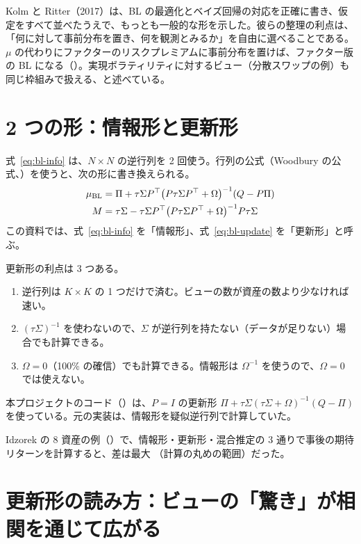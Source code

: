 Kolm と Ritter（2017）は、BL の最適化とベイズ回帰の対応を正確に書き、仮定をすべて並べたうえで、もっとも一般的な形を示した。彼らの整理の利点は、「何に対して事前分布を置き、何を観測とみるか」を自由に選べることである。$\mu$ の代わりにファクターのリスクプレミアムに事前分布を置けば、ファクター版の BL になる（）。実現ボラティリティに対するビュー（分散スワップの例）も同じ枠組みで扱える、と述べている。

\section{2 つの形：情報形と更新形}\label{sec:forms}

式~\eqref{eq:bl-info} は、$N\times N$ の逆行列を 2 回使う。行列の公式（Woodbury の公式、）を使うと、次の形に書き換えられる。
\begin{align}
\mu_{\mathrm{BL}}&=\Pi+\tau\Sigma P^{\top}\bigl(P\tau\Sigma P^{\top}+\Omega\bigr)^{-1}(Q-P\Pi)\label{eq:bl-update}\\
M&=\tau\Sigma-\tau\Sigma P^{\top}\bigl(P\tau\Sigma P^{\top}+\Omega\bigr)^{-1}P\tau\Sigma\label{eq:M-update}
\end{align}
この資料では、式~\eqref{eq:bl-info} を「情報形」、式~\eqref{eq:bl-update} を「更新形」と呼ぶ。

更新形の利点は 3 つある。

\begin{enumerate}
\item 逆行列は $K\times K$ の 1 つだけで済む。ビューの数が資産の数より少なければ速い。
\item $(\tau\Sigma)^{-1}$ を使わないので、$\Sigma$ が逆行列を持たない（データが足りない）場合でも計算できる。
\item $\Omega=0$（100\% の確信）でも計算できる。情報形は $\Omega^{-1}$ を使うので、$\Omega=0$ では使えない。
\end{enumerate}

本プロジェクトのコード（）は、$P=I$ の更新形 $\Pi+\tau\Sigma(\tau\Sigma+\Omega)^{-1}(Q-\Pi)$ を使っている。元の実装は、情報形を疑似逆行列で計算していた。

\begin{exbox}[3 つの形が同じ値になることの確認]
Idzorek の 8 資産の例（）で、情報形・更新形・混合推定の 3 通りで事後の期待リターンを計算すると、差は最大 （計算の丸めの範囲）だった。
\end{exbox}

\section{更新形の読み方：ビューの「驚き」が相関を通じて広がる}

